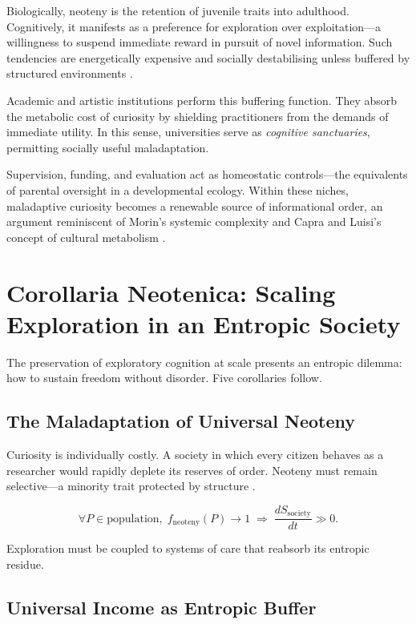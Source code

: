 \documentclass[12pt,a4paper]{article}
\begin{document}
Biologically, neoteny is the retention of juvenile traits into adulthood. 
Cognitively, it manifests as a preference for exploration over exploitation---a willingness 
to suspend immediate reward in pursuit of novel information. 
Such tendencies are energetically expensive and socially destabilising 
unless buffered by structured environments \citep{gopnik2025evolution}.

Academic and artistic institutions perform this buffering function. 
They absorb the metabolic cost of curiosity by shielding practitioners from the demands of 
immediate utility.  In this sense, universities serve as 
\textit{cognitive sanctuaries}, permitting socially useful maladaptation. 

Supervision, funding, and evaluation act as homeostatic controls---the equivalents of 
parental oversight in a developmental ecology. 
Within these niches, maladaptive curiosity becomes a renewable source of informational order,
an argument reminiscent of Morin’s systemic complexity \citep{morin2008method}
and Capra and Luisi’s concept of cultural metabolism \citep{capra2021systems}.

\section{Corollaria Neotenica: Scaling Exploration in an Entropic Society}

The preservation of exploratory cognition at scale presents an entropic dilemma:
how to sustain freedom without disorder.  
Five corollaries follow.

\subsection{The Maladaptation of Universal Neoteny}

Curiosity is individually costly.  A society in which every citizen behaves as a researcher
would rapidly deplete its reserves of order.
Neoteny must remain selective---a minority trait protected by structure
\citep{georgescu1971entropy}.

\[
\forall P \in \text{population}, \;
f_{\mathrm{neoteny}}(P)\to 1
\;\Rightarrow\;
\frac{dS_{\mathrm{society}}}{dt}\gg 0.
\]

Exploration must be coupled to systems of care that reabsorb its entropic residue.

\subsection{Universal Income as Entropic Buffer}
\end{document}
